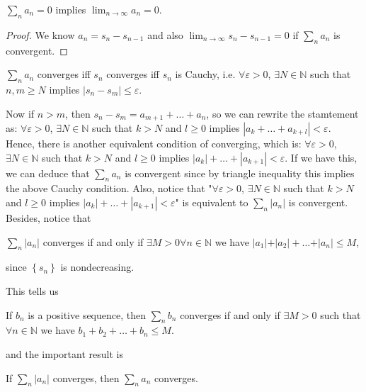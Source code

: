 \begin{exercise}
    \(\sum_{n} a_n = 0 \) implies \(\lim_{n \to \infty} a_n = 0 \).  
\end{exercise}
\begin{proof}
    We know \(a_n = s_n - s_{n-1}\) and also \(\lim_{n \to \infty} s_n - s_{n-1} = 0\) if \(\sum_{n} a_n \) is convergent. 
\end{proof}

\begin{prev}
 \(\sum_{n} a_n \) converges iff \(s_n\) converges iff \(s_n\) is Cauchy, i.e. \(\forall \varepsilon > 0\), \(\exists N \in \mathbb{N} \) such that \(n, m \ge N\) implies \(\left\vert s_n - s_m \right\vert \le \varepsilon  \).       
\end{prev}
Now if \(n > m\), then \(s_n - s_m = a_{m+1} + \dots + a_n\), so we can rewrite the stamtement as: \(\forall \varepsilon > 0\), \(\exists N \in \mathbb{N} \) such that \(k > N\) and \(l \ge 0\) implies \(\left\vert a_k + \dots + a_{k+l} \right\vert < \varepsilon  \). Hence, there is another equivalent condition of converging, which is: \(\forall \varepsilon > 0\), \(\exists N \in \mathbb{N} \) such that \(k > N\) and \(l \ge 0\) implies \(\vert a_k \vert + \dots + \left\vert a_{k+1} \right\vert < \varepsilon \). If we have this, we can deduce that \(\sum_{n} a_n \) is convergent since by triangle inequality this implies the above Cauchy condition. Also, notice that "\(\forall \varepsilon > 0\), \(\exists N \in \mathbb{N} \) such that \(k > N\) and \(l \ge 0\) implies \(\vert a_k \vert + \dots + \left\vert a_{k+1} \right\vert < \varepsilon \)" is equivalent to \(\sum_{n} \vert a_n \vert  \) is convergent.  Besides, notice that
\begin{center}
    \(\sum_{n} \vert a_n \vert  \) converges if and only if \(\exists M > 0 \forall n \in \mathbb{N} \) we have \(\vert a_1 \vert + \vert a_2 \vert + \dots + \vert a_n \vert \le M\),
\end{center}
since \(\left\{ s_n  \right\} \) is nondecreasing. 

This tells us 
\begin{corollary}
    If \(b_n\) is a positive sequence, then \(\sum_{n} b_n \) converges if and only if \(\exists M > 0\) such that \(\forall n \in \mathbb{N} \) we have \(b_1 + b_2 + \dots + b_n \le M\).   
\end{corollary}
and the important result is 
\begin{corollary}
    If \(\sum_{n} \vert a_n \vert\) converges, then \(\sum_{n} a_n \) converges.  
\end{corollary}


